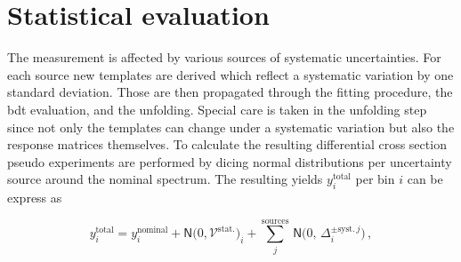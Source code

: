 

\section{Statistical evaluation}

The measurement is affected by various sources of systematic uncertainties. For each source new templates are derived which reflect a systematic variation by one standard deviation. Those are then propagated through the fitting procedure, the \gls{bdt} evaluation, and the unfolding. Special care is taken in the unfolding step since not only the templates can change under a systematic variation but also the response matrices themselves. To calculate the resulting differential cross section pseudo experiments are performed by dicing normal distributions per uncertainty source around the nominal spectrum. The resulting yields $y_{i}^\mathrm{total}$ per bin $i$ can be express as

\begin{equation}
y_{i}^\mathrm{total}=y_{i}^\mathrm{nominal}+\mathsf{N}\Big(0,\mathcal{V}^\mathrm{stat.}\Big)_{i}+\sum_{j}^\mathrm{sources}\,\mathsf{N}\Big(0,\,\Delta^{\mathrm{\pm syst.\,}j}_{i}\Big)\,,
\end{equation}

